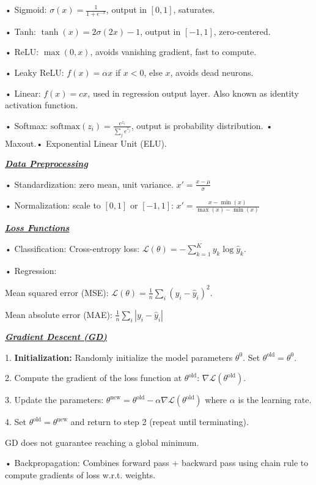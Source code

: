 \documentclass[10pt]{article}
\newcommand{\bulletPoint}[1]{\ul{\textit{\textbf{#1}}}}
\begin{document}
\begin{multicols*}{3}
• Sigmoid: $\sigma(x) = \frac{1}{1 + e^{-x}}$, output in $[0,1]$, saturates. \quad

• Tanh: $\tanh(x)=2\sigma(2x)-1$, output in $[-1,1]$, zero-centered. \quad

• ReLU: $\max(0, x)$, avoids vanishing gradient, fast to compute. \quad

• Leaky ReLU: $f(x) = \alpha x$ if $x < 0$, else $x$, avoids dead neurons. \quad

• Linear: $f(x) = cx$, used in regression output layer. 
Also known as identity activation function.

• Softmax: $\text{softmax}(z_i) = \frac{e^{z_i}}{\sum_j e^{z_j}}$, output is probability distribution.\quad
• Maxout.\quad • Exponential Linear Unit (ELU). 

\bulletPoint{Data Preprocessing} \quad

• Standardization: zero mean, unit variance. \quad
$x' = \frac{x - \mu}{\sigma}$ \quad

• Normalization: scale to $[0, 1]$ or $[-1, 1]$: $x' = \frac{x - \min(x)}{\max(x) - \min(x)}$

\bulletPoint{Loss Functions} \quad

• Classification: Cross-entropy loss: 
$\mathcal{L}(\theta) = -\sum_{k=1}^K y_k \log \hat{y}_k$. 

• Regression: 

Mean squared error (MSE): $\mathcal{L}(\theta) = \frac{1}{n} \sum_i (y_i - \hat{y}_i)^2$. 

Mean absolute error (MAE): $\frac{1}{n} \sum_i |y_i - \hat{y}_i|$

\bulletPoint{Gradient Descent (GD)} \quad

1. \textbf{Initialization:} Randomly initialize the model parameters $\theta^0$. Set $\theta^{\text{old}} = \theta^0$.

2. Compute the gradient of the loss function at $\theta^{\text{old}}$: $\nabla \mathcal{L}(\theta^{\text{old}})$.

3. Update the parameters:
$\theta^{\text{new}} = \theta^{\text{old}} - \alpha \nabla \mathcal{L}(\theta^{\text{old}})$
where $\alpha$ is the learning rate.

4. Set $\theta^{\text{old}} = \theta^{\text{new}}$ and return to step 2 (repeat until terminating).

GD does not guarantee reaching a global minimum.

• Backpropagation: Combines forward pass + backward pass using chain rule to compute gradients of loss w.r.t. weights. 


\end{multicols*}
\end{document}

